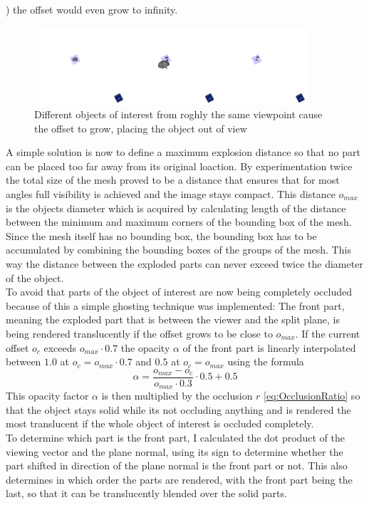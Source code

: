 ) the offset would even grow to infinity.\\
\begin{figure}[tb]
	\centering
	\includegraphics[width=0.9\textwidth]{chapters/figures/infinity}
	\caption{Different objects of interest from roghly the same viewpoint cause the offset to grow, placing the object out of view}
	\label{fig:infinity}
\end{figure}
A simple solution is now to define a maximum explosion distance so that no part can be placed too far away from its original loaction. By experimentation twice the total size of the mesh proved to be a distance that ensures that for most angles full visibility is achieved and the image stays compact. This distance $o_{max}$ is the objects diameter which is acquired by calculating length of the distance between the minimum and maximum corners of the bounding box of the mesh. Since the mesh itself has no bounding box, the bounding box has to be accumulated by combining the bounding boxes of the groups of the mesh. This way the distance between the exploded parts can never exceed twice the diameter of the object.\\
To avoid that parts of the object of interest are now being completely occluded because of this a simple ghosting technique was implemented: 
The front part, meaning the exploded part that is between the viewer and the split plane, is being rendered translucently if the offset grows to be close to $o_{max}$. 
If the current offset $o_c$ exceeds $o_{max} \cdot 0.7$ the opacity $\alpha$ of the front part is linearly interpolated between $1.0$ at $o_c = o_{max} \cdot 0.7$ and $0.5$ at  $o_c = o_{max}$ using the formula
\begin{equation}
	\alpha = \frac{o_{max}-o_c}{o_{max} \cdot 0.3} \cdot 0.5 + 0.5
\end{equation}
This opacity factor $\alpha$ is then multiplied by the occlusion $r$ \ref{eq:OcclusionRatio}  so that the object stays solid while its not occluding anything and is rendered the most translucent if the whole object of interest is occluded completely.\\
To determine which part is the front part, I calculated the dot product of the viewing vector and the plane normal, using its sign to determine whether the part shifted in direction of the plane normal is the front part or not. This also determines in which order the parts are rendered, with the front part being the last, so that it can be translucently blended over the solid parts.\\
